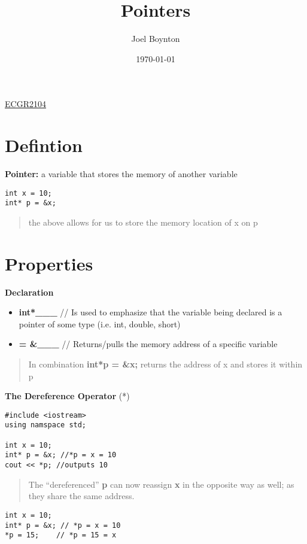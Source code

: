 \documentclass[11pt]{article}
\author{Joel Boynton}
\date{\today}
\title{Pointers}
\begin{document}
\maketitle
\href{ecgr2104.org}{ECGR2104}
\section{Defintion}
\label{sec:orgacaf001}
\textbf{Pointer:} a variable that stores the memory of another variable
\begin{verbatim}
int x = 10;
int* p = &x;
\end{verbatim}
\begin{quote}
the above allows for us to store the memory location of x on p
\end{quote}
\section{Properties}
\label{sec:org83c6a53}
\textbf{Declaration}

\begin{itemize}
\item \textbf{int*\_\_\_}     // Is used to emphasize that the variable being declared is a pointer of some type (i.e. int, double, short)

\item \textbf{= \&\_\_\_}   // Returns/pulls the memory address of a specific variable
\end{itemize}

\begin{quote}
In combination \textbf{int*p = \&x;} returns the address of x and stores it within p
\end{quote}
\textbf{The Dereference Operator} (*)
\begin{verbatim}
#include <iostream>
using namspace std;

int x = 10;
int* p = &x; //*p = x = 10
cout << *p; //outputs 10
\end{verbatim}
\begin{quote}
The ``dereferenced'' \textbf{p} can now reassign \textbf{x} in the opposite way as well; as they share the same address.
\end{quote}
\begin{verbatim}
int x = 10;
int* p = &x; // *p = x = 10
*p = 15;    // *p = 15 = x
\end{verbatim}
\end{document}
